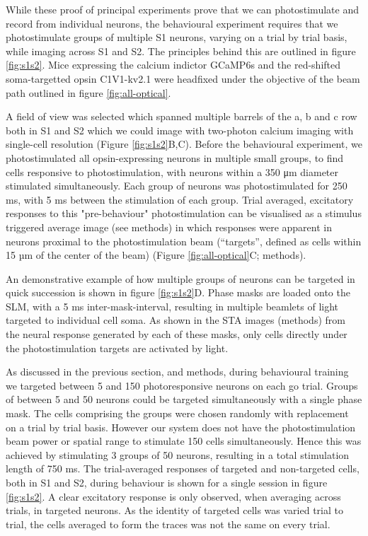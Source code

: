 While these proof of principal experiments prove that we can photostimulate and record from individual neurons, the behavioural experiment requires that we photostimulate groups of multiple S1 neurons, varying on a trial by trial basis, while imaging across S1 and S2. The principles behind this are outlined in figure \ref{fig:s1s2}. Mice expressing the calcium indictor GCaMP6s \cite{chen_ultrasensitive_2013} and the red-shifted soma-targetted opsin C1V1-kv2.1 \cite{yizhar_neocortical_2011, chettih_single-neuron_2019} were headfixed under the objective of the beam path outlined in figure \ref{fig:all-optical}. 

A field of view was selected which spanned multiple barrels of the a, b and c row both in S1 and S2 which we could image with two-photon calcium imaging with single-cell resolution (Figure \ref{fig:s1s2}B,C). Before the behavioural experiment, we photostimulated all opsin-expressing neurons in multiple small groups, to find cells responsive to photostimulation, with neurons within a 350 μm diameter stimulated simultaneously. Each group of neurons was photostimulated for 250 ms, with 5 ms between the stimulation of each group. Trial averaged, excitatory responses to this "pre-behaviour" photostimulation can be visualised as a stimulus triggered average image (see methods) in which responses were apparent in neurons proximal to the photostimulation beam (“targets”, defined as cells within 15 µm of the center of the beam) (Figure \ref{fig:all-optical}C; methods).

An demonstrative example of how multiple groups of neurons can be targeted in quick succession is shown in figure \ref{fig:s1s2}D. Phase masks are loaded onto the SLM, with a 5 ms inter-mask-interval, resulting in multiple beamlets of light targeted to individual cell soma. As shown in the STA images (methods) from the neural response generated by each of these masks, only cells directly under the photostimulation targets are activated by light. 

As discussed in the previous section, and methods, during behavioural training we targeted between 5 and 150 photoresponsive neurons on each go trial. Groups of between 5 and 50 neurons could be targeted simultaneously with a single phase mask. The cells comprising the groups were chosen randomly with replacement on a trial by trial basis. However our system does not have the photostimulation beam power or spatial range to stimulate 150 cells simultaneously. Hence this was achieved by stimulating 3 groups of 50 neurons, resulting in a total stimulation length of 750 ms. The trial-averaged responses of targeted and non-targeted cells, both in S1 and S2, during behaviour is shown for a single session in figure \ref{fig:s1s2}. A clear excitatory response is only observed, when averaging across trials, in targeted neurons. As the identity of targeted cells was varied trial to trial, the cells averaged to form the traces was not the same on every trial.

